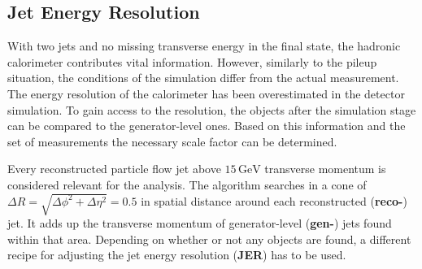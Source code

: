 \subsection{Jet Energy Resolution}
\label{sec:jer}

With two jets and no missing transverse energy in the final state, the hadronic calorimeter contributes vital information. However, similarly to the pileup situation, the conditions of the simulation differ from the actual measurement. The energy resolution of the calorimeter has been overestimated in the detector simulation. To gain access to the resolution, the objects after the simulation stage can be compared to the generator-level ones. Based on this information and the set of measurements the necessary scale factor can be determined.

Every reconstructed particle flow jet above $15\,\text{GeV}$ transverse momentum is considered relevant for the analysis. The algorithm searches in a cone of $\Delta R = \sqrt{\Delta\phi^2 + \Delta\eta^2} = 0.5$ in spatial distance around each reconstructed (\textbf{reco-}) jet. It adds up the transverse momentum of generator-level (\textbf{gen-}) jets found within that area. Depending on whether or not any objects are found, a different recipe for adjusting the jet energy resolution (\textbf{JER}) has to be used.

